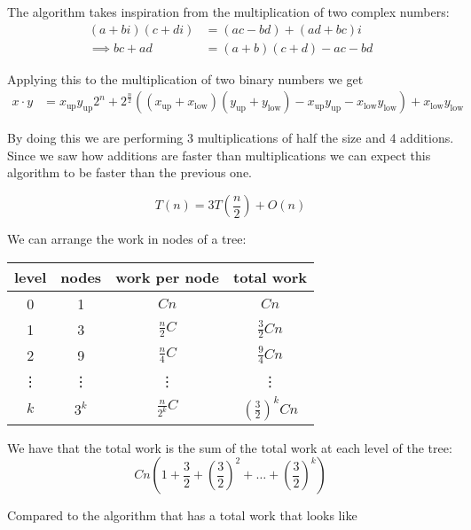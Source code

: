 \documentclass[10pt]{extarticle}
\begin{document}
The algorithm takes inspiration from the multiplication of two complex numbers:
\begin{align*}
    (a + bi)(c + di) & = (ac - bd) + (ad + bc)i   \\
    \implies bc + ad & = (a + b)(c + d) - ac - bd
\end{align*}

Applying this to the multiplication of two binary numbers we get
\begin{align*}
    x \cdot y & = x_{\text{up}} y_{\text{up}} 2^n
    + 2^\frac{n}{2}((x_{\text{up}} + x_{\text{low}})(y_{\text{up}} + y_{\text{low}}) - x_{\text{up}}y_{\text{up}} - x_{\text{low}}y_{\text{low}}) + x_{\text{low}}y_{\text{low}}
\end{align*}

By doing this we are performing 3 multiplications of half the size and 4 additions.
Since we saw how additions are faster than multiplications we can expect this algorithm to be faster than the previous one.

$$
    T(n) = 3T\left(\frac{n}{2}\right) + O(n)
$$

We can arrange the work in nodes of a tree:

\begin{center}
    \begin{tabular}{ |c|c|c|c| }
        \hline
        level  & nodes  & work per node    & total work                      \\
        \hline
        0      & 1      & $Cn$             & $Cn$                            \\
        1      & 3      & $\frac{n}{2}C$   & $\frac{3}{2}Cn$                 \\
        2      & 9      & $\frac{n}{4}C$   & $\frac{9}{4}Cn$                 \\
        \vdots & \vdots & \vdots           & \vdots                          \\
        $k$    & $3^k$  & $\frac{n}{2^k}C$ & $\left(\frac{3}{2}\right)^k Cn$ \\
        \hline
    \end{tabular}
\end{center}

We have that the total work is the sum of the total work at each level of the tree:
$$
    Cn\left(1+\frac{3}{2}+\left(\frac{3}{2}\right)^2+\dots+\left(\frac{3}{2}\right)^k\right)
$$

Compared to the  algorithm that has a total work that looks like
\end{document}
